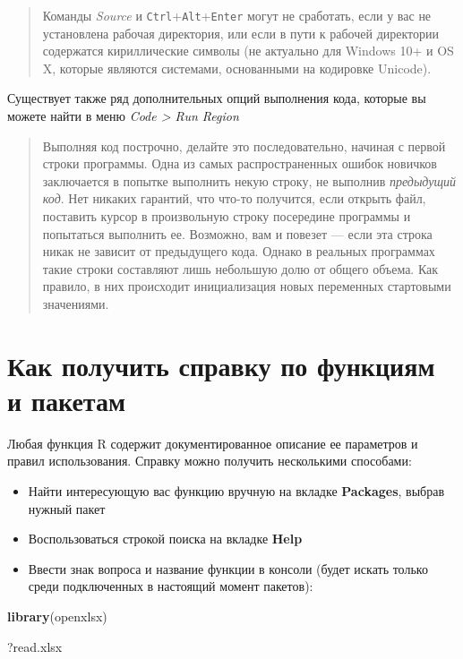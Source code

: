 \documentclass[]{book}
\newenvironment{Shaded}{\begin{snugshade}}{\end{snugshade}}
\newcommand{\KeywordTok}[1]{\textcolor[rgb]{0.13,0.29,0.53}{\textbf{#1}}}
\newcommand{\NormalTok}[1]{#1}
\providecommand{\tightlist}{%
  \setlength{\itemsep}{0pt}\setlength{\parskip}{0pt}}
\begin{document}
\begin{quote}
Команды \emph{Source} и \texttt{Ctrl}+\texttt{Alt}+\texttt{Enter} могут
не сработать, если у вас не установлена рабочая директория, или если в
пути к рабочей директории содержатся кириллические символы (не актуально
для Windows 10+ и OS X, которые являются системами, основанными на
кодировке Unicode).
\end{quote}

Существует также ряд дополнительных опций выполнения кода, которые вы
можете найти в меню \emph{Code \textgreater{} Run Region}

\begin{quote}
Выполняя код построчно, делайте это последовательно, начиная с первой
строки программы. Одна из самых распространенных ошибок новичков
заключается в попытке выполнить некую строку, не выполнив
\emph{предыдущий код}. Нет никаких гарантий, что что-то получится, если
открыть файл, поставить курсор в произвольную строку посередине
программы и попытаться выполнить ее. Возможно, вам и повезет --- если
эта строка никак не зависит от предыдущего кода. Однако в реальных
программах такие строки составляют лишь небольшую долю от общего объема.
Как правило, в них происходит инициализация новых переменных стартовыми
значениями.
\end{quote}

\section*{Как получить справку по функциям и пакетам}\label{------}

Любая функция R содержит документированное описание ее параметров и
правил использования. Справку можно получить несколькими способами:

\begin{itemize}
\tightlist
\item
  Найти интересующую вас функцию вручную на вкладке \textbf{Packages},
  выбрав нужный пакет
\item
  Воспользоваться строкой поиска на вкладке \textbf{Help}
\item
  Ввести знак вопроса и название функции в консоли (будет искать только
  среди подключенных в настоящий момент пакетов):
\end{itemize}

\begin{Shaded}
\begin{Highlighting}[]
\KeywordTok{library}\NormalTok{(openxlsx)}

\NormalTok{?read.xlsx}
\end{Highlighting}
\end{Shaded}
\end{document}
